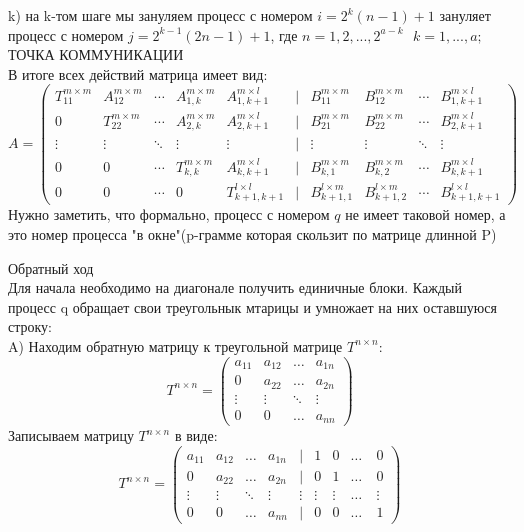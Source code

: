 \documentclass[a4paper,12pt]{article}
\begin{document}
k) на k-том шаге мы зануляем процесс с номером $i = 2^{k}(n-1)+1$ зануляет процесс с номером $j = 2^{k-1}(2n-1)+1$, где $n = 1,2,...,2^{a-k} \ \ \ k = 1,...,a;$\\
{\fontsize{10}{10}\selectfont ТОЧКА КОММУНИКАЦИИ}\\
В итоге всех действий матрица имеет вид:
\begin{equation}
A=
  \begin{pmatrix} 
    T_{11}^{m \times m} & A_{12}^{m \times m} & \cdots & A_{1,k}^{m \times m} & A_{1,k+1}^{m \times l} & | & B_{11}^{m \times m} &  B_{12}^{m \times m} & \cdots & B_{1,k+1}^{m \times l}\\
    0 & T_{22}^{m \times m} & \cdots & A_{2,k}^{m \times m} & A_{2,k+1}^{m \times l} & | & B_{21}^{m \times m} &  B_{22}^{m \times m} & \cdots & B_{2,k+1}^{m \times l}\\
    \vdots & \vdots & \ddots & \vdots & \vdots & | & \vdots & \vdots & \ddots & \vdots\\ 
    0 & 0 & \cdots & T_{k,k}^{m \times m} & A_{k,k+1}^{m \times l} & | & B_{k,1}^{m \times m} &  B_{k,2}^{m \times m} & \cdots & B_{k,k+1}^{m \times l}\\
    0 & 0 & \cdots & 0 & T_{k+1,k+1}^{l \times l} & | & B_{k+1,1}^{l \times m} &  B_{k+1,2}^{l \times m} & \cdots & B_{k+1,k+1}^{l \times l} 
  \end{pmatrix}
\end{equation}
Нужно заметить, что формально, процесс с номером $q$ не имеет таковой номер, а это номер процесса "в окне"(p-грамме которая скользит по матрице длинной P)

{\fontsize{14}{14}\selectfont Обратный ход}\\

Для начала необходимо на диагонале получить единичные блоки.
Каждый процесс q обращает свои треугольнык мтарицы и умножает на них оставшуюся строку:\\

A) Находим обратную матрицу к треугольной матрице $T^{n\times n}$: 
$$T^{n\times n}=
   \begin{pmatrix}
     a_{11}& a_{12} &\ldots & a_{1n}\\
     0& a_{22} &\ldots & a_{2n}\\
     \vdots& \vdots &\ddots & \vdots\\
     0& 0 &\ldots & a_{nn}
    \end{pmatrix}
$$ 
Записываем матрицу $T^{n\times n}$ в виде:
$$T^{n\times n}=
   \begin{pmatrix}
     a_{11}& a_{12} &\ldots & a_{1n} & | & 1 & 0 & \ldots \ & 0\\
     0& a_{22} &\ldots & a_{2n} & | & 0 & 1 & \ldots \ & 0\\
     \vdots& \vdots &\ddots & \vdots &\vdots& \vdots &\vdots & \ldots & \vdots \\
     0& 0 &\ldots & a_{nn} & | & 0 & 0 & \ldots \ & 1
    \end{pmatrix}
$$ 
\end{document}
